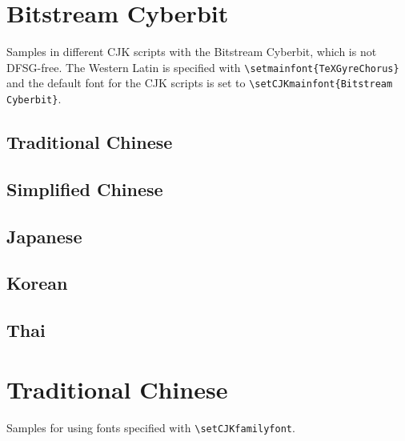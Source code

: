 \documentclass[12pt]{scrartcl}
\begin{document}
\begin{CJK}{UTF8}{song}
\section{Bitstream Cyberbit}

Samples in different CJK scripts with the Bitstream Cyberbit, which is
not DFSG-free.
The Western Latin is specified with \verb|\setmainfont{TeXGyreChorus}|
and the default font for the CJK scripts is set to
\verb|\setCJKmainfont{Bitstream Cyberbit}|.


\subsection{Traditional Chinese}
\CJKnospace
\testZHT

\subsection{Simplified Chinese}
\testZHS

\subsection{Japanese}
\testJP

\CJKspace
\subsection{Korean}

\testKR

\subsection{Thai}
\testTH


\newpage


\section{Traditional Chinese}

Samples for using fonts specified with \verb|\setCJKfamilyfont|.

\CJKspace



\end{CJK}
\end{document}

